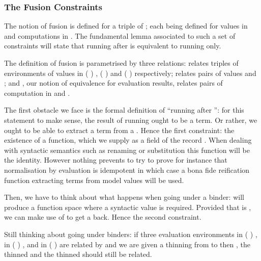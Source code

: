 \subsubsection{The Fusion Constraints}

The notion of fusion is defined for a triple of ; each 
being defined for values in  and computations in . The
fundamental lemma associated to such a set of constraints will state that
running  after  is equivalent to running  only.

The definition of fusion is parametrised by three relations:  relates
triples of environments of values in {( )  },
{( )  } and {( )  }
respectively;  relates pairs of values  and ;
and , our notion of equivalence for evaluation results, relates pairs
of computation in  and .


The first obstacle we face is the formal definition of ``running 
after '': for this statement to make sense, the result of running
 ought to be a term. Or rather, we ought to be able to extract a
term from a . Hence the first constraint: the existence of a 
function, which we supply as a field of the record . When dealing with
syntactic semantics such as renaming or substitution
this function will be the identity. However nothing prevents to try to prove for
instance that normalisation by evaluation is idempotent in which case a bona fide
reification function extracting terms from model values will be used.


Then, we have to think about what happens when going under a binder: 
will produce a  function space where a syntactic
value is required. Provided that  is , we can make use of 
to get a  back. Hence the second constraint.


Still thinking about going under binders: if three evaluation environments
 in {( )  },  in
{( )  }, and  in {( )  }
are related by  and we are given a thinning  from  to 
then , the thinned  and the thinned  should still be related.

